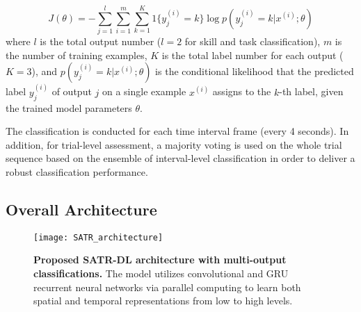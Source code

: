 \documentclass[letterpaper, 10 pt, conference, twoside]{IEEEtran}
\begin{document}
\begin{equation}
\label{eq: cross-entropy}
J(\theta) = -\displaystyle\sum_{j=1}^{l} \displaystyle\sum_{i=1}^{m}\displaystyle\sum_{k=1}^{K}{ 1 \{y_{j}^{(i)}=k \}  \log{p(y_{j}^{(i)}=k | x^{(i)}; \theta )} }
\end{equation} 
where $l$ is the total output number ($l=2$ for skill and task classification), $m$ is the number of training examples, $K$ is the total label number for each output ($K=3$), and $p(y_{j}^{(i)}=k | x^{(i)}; \theta)$ is the conditional likelihood that the predicted label $y_{j}^{(i)}$ of output $j$ on a single example $x^{(i)}$ assigns to the $k$-th label, given the trained model parameters $\theta$.   

The classification is conducted for each time interval frame (every 4 seconds). In addition, for trial-level assessment, a majority voting is used on the whole trial sequence based on the ensemble of interval-level classification in order to deliver a robust classification performance. 



\subsection{Overall Architecture}

\begin{figure*}[tb]
      \centering
     \texttt{[image: SATR\_architecture]}
     \caption{ {\bf Proposed SATR-DL architecture with multi-output classifications.} The model utilizes convolutional and GRU recurrent neural networks via parallel computing to learn both spatial and temporal representations from low to high levels. 
		} 
      \label{fig: architecture} 
\vspace{-0.5cm}
\end{figure*}
\end{document}

